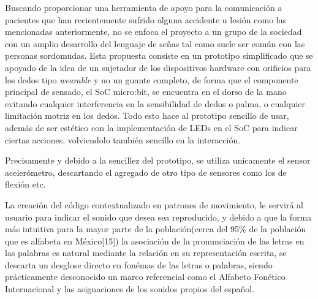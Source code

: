 \hfill \break
\justifying
Buscando proporcionar una herramienta de apoyo para la comunicación a pacientes que han recientemente sufrido alguna accidente u lesión como las mencionadas anteriormente, no se enfoca el proyecto a un grupo de la sociedad con un amplio desarrollo del lenguaje de señas tal como suele ser común con las personas sordomudas. Esta propuesta consiste en un prototipo simplificado que se apoyado de la idea de un sujetador de los dispositivos hardware con orificios para los dedos tipo \textit{wearable} y no un guante completo, de forma que el componente principal de sensado, el SoC micro:bit, se encuentra en el dorso de la mano evitando cualquier interferencia en la sensibilidad de dedos o palma, o cualquier limitación motriz en los dedos. Todo esto hace al prototipo sencillo de usar, además de ser estético con la implementación de LEDs en el SoC para indicar ciertas acciones, volviendolo también sencillo en la interacción.

\hfill \break
\justifying
Precisamente y debido a la sencillez del prototipo, se utiliza unicamente el sensor acelerómetro, descartando el agregado de otro tipo de sensores como los de flexión etc.

\hfill\break
\justifying
La creación del código contextualizado en patrones de movimiento, le servirá al usuario para indicar el sonido que desea sea reproducido, y debido a que la forma más intuitiva para la mayor parte de la población(cerca del 95\% de la población que es alfabeta en México[15]) la asociación de la pronunciación de las letras en las palabras es natural mediante la relación en su representación escrita, se descarta un desglose directo en fonémas de las letras o palabras, siendo prácticamente desconocido un marco referencial como el Alfabeto Fonético Internacional y las asignaciones de los sonidos propios del español.